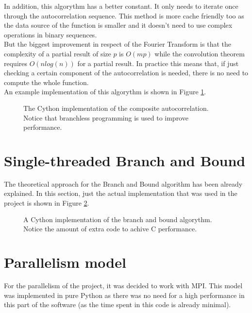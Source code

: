       In addition, this algorythm has a better constant. It only needs to
      iterate once through the autocorrelation sequence. This method is more
      cache friendly too as the data source of the function is smaller and it
      doesn't need to use complex operations in binary sequences.\\

      But the biggest improvement in respect of the Fourier Transform is that
      the complexity of a partial result of size $p$ is $O(mp)$ while the
      convolution theorem requires $O(nlog(n))$ for a partial result. In
      practice this means that, if just checking a certain component
      of the autocorrelation is needed, there is no need to compute the whole
      function.\\

      An example implementation of this algorythm is shown in Figure
      \ref{composite_auto:fig:1}.

      \begin{figure}[ht!]
        \caption{The Cython implementation of the composite autocorrelation.
        Notice that branchless programming is used to improve performance.}
        \label{composite_auto:fig:1}
      \end{figure}

  \section{Single-threaded Branch and Bound}

  The theoretical approach for the Branch and Bound algorithm has been already
  explained. In this section, just the actual implementation that was used
  in the project is shown in Figure \ref{composite_auto:fig:2}.

  \begin{figure}[ht!]
    \caption{A Cython implementation of the branch and bound algorythm. Notice
    the amount of extra code to achive C performance.}
    \label{composite_auto:fig:2}
  \end{figure}


  \section{Parallelism model}

  For the parallelism of the project, it was decided to work with MPI. This model
  was implemented in pure Python as there was no need for a high performance in
  this part of the software (as the time spent in this code is already
  minimal).\\

